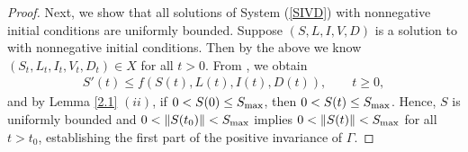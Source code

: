 \documentclass{CMHPhD-SIVD}
\begin{document}
\begin{proof}
%





Next, we show that all solutions of System (\ref{SIVD}) with nonnegative initial conditions are uniformly bounded.
	Suppose $(S, L, I,  V,  D)$ is a solution to  with nonnegative initial conditions.  Then by the above we know $(S_t,L_t,I_t,V_t,D_t)\in X$ for all $t >0$.
	From , we obtain
\begin{align*}
	S'(t)\leq f(S(t), L(t), I(t), D(t)),   \qquad t\geq0,
\end{align*}
	and by Lemma \ref{2.1} $(ii)$, if $0<S(0)\leq S_{\text{max}}$, then $0< S(t)\leq S_{\text{max}}$.
	Hence, $S$ is uniformly bounded and $0 < \|S(t_0)\| < S_{\text{max}}$ implies $0 < \|S(t)\| < S_{\text{max}}$ for all $t>t_0$, establishing the first part of the positive invariance of $\Gamma$.
 
 {}
 

\end{proof}
\end{document}
